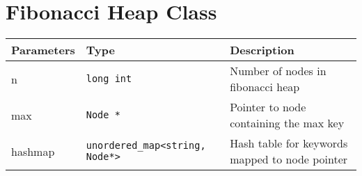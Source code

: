 \documentclass[12pt, reqno]{amsart}
\begin{document}
\newpage
\section*{Fibonacci Heap Class}

\begin{center}
    \begin{tabular}{| l | l | p{6.8cm} |}
    \hline
    {\bfseries Parameters} & {\bfseries Type} & {\bfseries Description} \\ \hline
    n & \texttt{long int} & Number of nodes in fibonacci heap \\ \hline
    max & \texttt{Node *} & Pointer to node containing the max key \\ \hline
    hashmap & \texttt{unordered\_map<string, Node*>} & Hash table for keywords mapped to node pointer \\ \hline
    \end{tabular}
\end{center}
\vspace{2mm}

\end{document}
